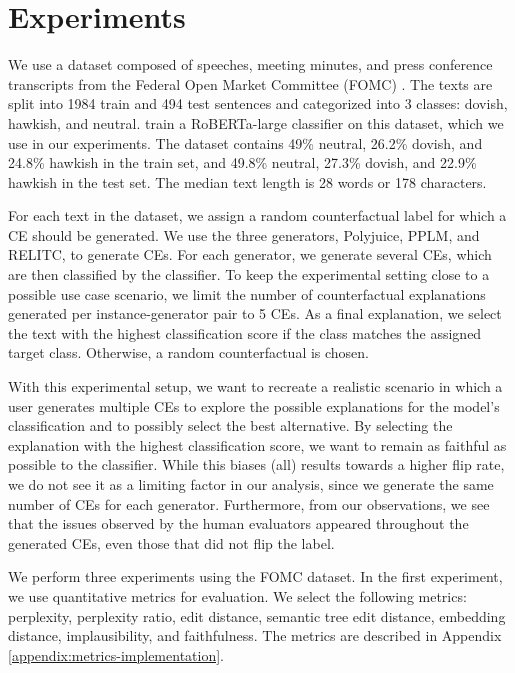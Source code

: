 \documentclass[11pt]{article}
\begin{document}
\section{Experiments}\label{sec:experiments}

We use a dataset composed of speeches, meeting minutes, and press conference transcripts from the Federal Open Market Committee (FOMC) \cite{shah_trillion_2023}. The texts are split into 1984 train and 494 test sentences and categorized into 3 classes: dovish, hawkish, and neutral. \citet{shah_trillion_2023} train a RoBERTa-large classifier on this dataset, which we use in our experiments. The dataset contains 49\% neutral, 26.2\% dovish, and 24.8\% hawkish in the train set, and 49.8\% neutral, 27.3\% dovish, and 22.9\% hawkish in the test set. The median text length is 28 words or 178 characters.

For each text in the dataset, we assign a random counterfactual label for which a CE should be generated. We use the three generators, Polyjuice, PPLM, and RELITC, to generate CEs. For each generator, we generate several CEs, which are then classified by the classifier. To keep the experimental setting close to a possible use case scenario, we limit the number of counterfactual explanations generated per instance-generator pair to 5 CEs. As a final explanation, we select the text with the highest classification score if the class matches the assigned target class. Otherwise, a random counterfactual is chosen.


With this experimental setup, we want to recreate a realistic scenario in which a user generates multiple CEs to explore the possible explanations for the model's classification and to possibly select the best alternative. By selecting the explanation with the highest classification score, we want to remain as faithful as possible to the classifier. While this biases (all) results towards a higher flip rate, we do not see it as a limiting factor in our analysis, since we generate the same number of CEs for each generator. Furthermore, from our observations, we see that the issues observed by the human evaluators appeared throughout the generated CEs, even those that did not flip the label. 

We perform three experiments using the FOMC dataset. In the first experiment, we use quantitative metrics for evaluation. We select the following metrics: perplexity, perplexity ratio, edit distance, semantic tree edit distance, embedding distance, implausibility, and faithfulness. The metrics are described in Appendix \ref{appendix:metrics-implementation}. 
\end{document}

